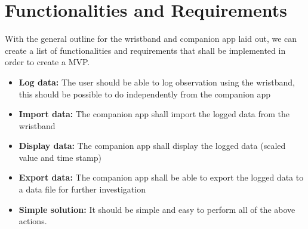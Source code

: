 \section{Functionalities and Requirements}\label{requirements}
With the general outline for the wristband and companion app laid out, we can create a list of functionalities and requirements that shall be implemented in order to create a MVP.

\begin{itemize}
    \item \textbf{Log data:} The user should be able to log observation using the wristband, this should be possible to do independently from the companion app
    \item \textbf{Import data:} The companion app shall import the logged data from the wristband
    \item \textbf{Display data:} The companion app shall display the logged data (scaled value and time stamp)
    \item \textbf{Export data:} The companion app shall be able to export the logged data to a data file for further investigation
	\item \textbf{Simple solution:} It should be simple and easy to perform all of the above actions.
\end{itemize}